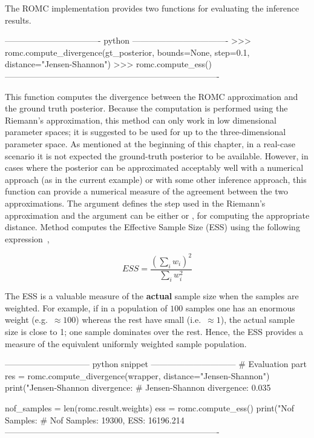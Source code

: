 The ROMC implementation provides two functions for evaluating the
inference results.

\begin{Code}
---------------------------------- python ----------------------------------  
>>> romc.compute_divergence(gt_posterior,
                            bounds=None,
                            step=0.1,
                            distance="Jensen-Shannon")
>>> romc.compute_ess()
----------------------------------------------------------------------------
\end{Code}

\noindent
This function computes the divergence between the ROMC approximation
and the ground truth posterior. Because the computation is performed
using the Riemann's approximation, this method can only work in low
dimensional parameter spaces; it is suggested to be used for up to the
three-dimensional parameter space. As mentioned at the beginning of
this chapter, in a real-case scenario it is not expected the
ground-truth posterior to be available. However, in cases where the
posterior can be approximated acceptably well with a numerical approach
(as in the current example) or with some other inference approach,
this function can provide a numerical measure of the agreement between
the two approximations. The argument  defines the step used
in the Riemann's approximation and the argument  can
be either  or , for computing 
the appropriate distance. Method 
computes the Effective Sample Size (ESS) using the following
expression~\cite{Sudman1967},

\begin{equation} \label{eq:ESS}
  ESS = \frac{(\sum_i w_i)^2}{\sum_i w_i^2}
\end{equation}

The ESS is a valuable measure of the \textbf{actual} sample size when
the samples are weighted. For example, if in a population of $100$
samples one has an enormous weight (e.g.\ $\approx 100$) whereas the
rest have small (i.e.\ $\approx 1$), the actual sample size is close
to 1; one sample dominates over the rest. Hence, the ESS provides a
measure of the equivalent uniformly weighted sample population.

\begin{Code}
------------------------------ python snippet ------------------------------  
  # Evaluation part
  res = romc.compute_divergence(wrapper, distance="Jensen-Shannon")                                 
  print("Jensen-Shannon divergence: %
  # Jensen-Shannon divergence: 0.035

  nof_samples = len(romc.result.weights)
  ess = romc.compute_ess()
  print("Nof Samples: %
  # Nof Samples: 19300, ESS: 16196.214
----------------------------------------------------------------------------  
\end{Code}
